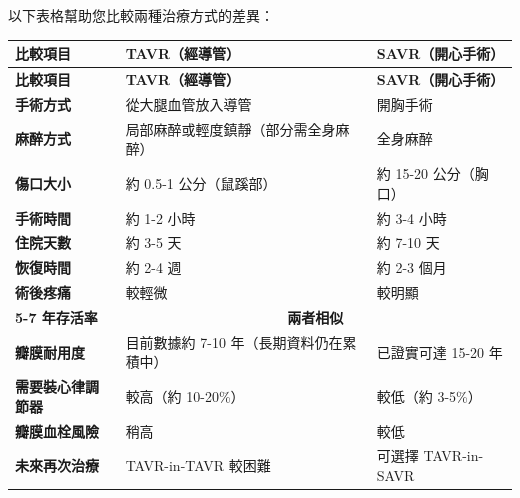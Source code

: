 \documentclass[12pt,a4paper]{article}
\begin{document}
\begin{center}
{\large 以下表格幫助您比較兩種治療方式的差異：}
\end{center}

\vspace{0.5cm}

\begin{center}
\begin{longtable}{p{4cm}p{5.5cm}p{5.5cm}}
\toprule
\rowcolor{emergency_blue!20}
\textbf{比較項目} & \textbf{TAVR（經導管）} & \textbf{SAVR（開心手術）} \\
\midrule
\endfirsthead
\toprule
\rowcolor{emergency_blue!20}
\textbf{比較項目} & \textbf{TAVR（經導管）} & \textbf{SAVR（開心手術）} \\
\midrule
\endhead
\bottomrule
\endfoot

\rowcolor{light_blue}
\textbf{手術方式} & 從大腿血管放入導管 & 開胸手術 \\
\midrule

\textbf{麻醉方式} & 局部麻醉或輕度鎮靜（部分需全身麻醉） & 全身麻醉 \\
\midrule

\rowcolor{light_blue}
\textbf{傷口大小} & 約 0.5-1 公分（鼠蹊部） & 約 15-20 公分（胸口） \\
\midrule

\textbf{手術時間} & 約 1-2 小時 & 約 3-4 小時 \\
\midrule

\rowcolor{light_blue}
\textbf{住院天數} & 約 3-5 天 & 約 7-10 天 \\
\midrule

\textbf{恢復時間} & 約 2-4 週 & 約 2-3 個月 \\
\midrule

\rowcolor{light_blue}
\textbf{術後疼痛} & 較輕微 & 較明顯 \\
\midrule

\textbf{5-7 年存活率} & \multicolumn{2}{c}{\textbf{兩者相似}} \\
\midrule

\rowcolor{light_blue}
\textbf{瓣膜耐用度} & 目前數據約 7-10 年\newline （長期資料仍在累積中） & 已證實可達 15-20 年 \\
\midrule

\textbf{需要裝心律調節器} & 較高（約 10-20\%） & 較低（約 3-5\%） \\
\midrule

\rowcolor{light_blue}
\textbf{瓣膜血栓風險} & 稍高 & 較低 \\
\midrule

\textbf{未來再次治療} & TAVR-in-TAVR 較困難 & 可選擇 TAVR-in-SAVR \\

\bottomrule
\end{longtable}
\end{center}
\end{document}
